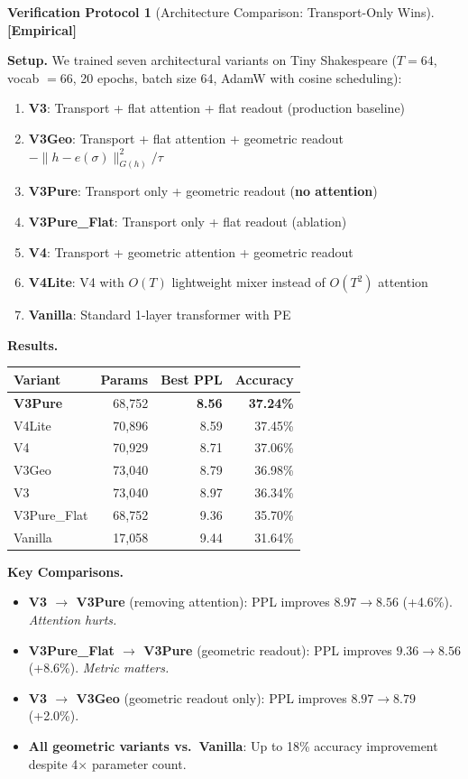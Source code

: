 \documentclass[11pt,a4paper]{article}
\theoremstyle{definition}
\newtheorem{protocol}[theorem]{Verification Protocol}
\theoremstyle{remark}
\newcommand{\statusempirical}{\textcolor{purple!70!black}{\textbf{[Empirical]}}}
\begin{document}
\begin{protocol}[Architecture Comparison: Transport-Only 
Wins]\label{prot:architecture_comparison}
\statusempirical

\textbf{Setup.} We trained seven architectural variants on 
Tiny Shakespeare ($T = 64$, vocab $= 66$, 20 epochs, batch 
size 64, AdamW with cosine scheduling):

\begin{enumerate}[label=\textbf{(\alph*)}]
    \item \textbf{V3}: Transport + flat attention + flat readout 
    (production baseline)
    \item \textbf{V3Geo}: Transport + flat attention + geometric 
    readout $-\|h - e(\sigma)\|^2_{G(h)}/\tau$
    \item \textbf{V3Pure}: Transport only + geometric readout 
    (\textbf{no attention})
    \item \textbf{V3Pure\_Flat}: Transport only + flat readout 
    (ablation)
    \item \textbf{V4}: Transport + geometric attention + geometric 
    readout
    \item \textbf{V4Lite}: V4 with $O(T)$ lightweight mixer instead 
    of $O(T^2)$ attention
    \item \textbf{Vanilla}: Standard 1-layer transformer with PE
\end{enumerate}

\textbf{Results.}
\begin{center}
\begin{tabular}{lrrr}
\toprule
Variant & Params & Best PPL & Accuracy \\
\midrule
\textbf{V3Pure} & 68{,}752 & \textbf{8.56} & \textbf{37.24\%} \\
V4Lite & 70{,}896 & 8.59 & 37.45\% \\
V4 & 70{,}929 & 8.71 & 37.06\% \\
V3Geo & 73{,}040 & 8.79 & 36.98\% \\
V3 & 73{,}040 & 8.97 & 36.34\% \\
V3Pure\_Flat & 68{,}752 & 9.36 & 35.70\% \\
Vanilla & 17{,}058 & 9.44 & 31.64\% \\
\bottomrule
\end{tabular}
\end{center}

\textbf{Key Comparisons.}
\begin{itemize}
    \item \textbf{V3 $\to$ V3Pure} (removing attention): 
    PPL improves $8.97 \to 8.56$ (+4.6\%). \emph{Attention hurts.}
    \item \textbf{V3Pure\_Flat $\to$ V3Pure} (geometric readout): 
    PPL improves $9.36 \to 8.56$ (+8.6\%). \emph{Metric matters.}
    \item \textbf{V3 $\to$ V3Geo} (geometric readout only): 
    PPL improves $8.97 \to 8.79$ (+2.0\%). 
    \item \textbf{All geometric variants vs.\ Vanilla}: 
    Up to 18\% accuracy improvement despite 4$\times$ parameter count.
\end{itemize}


\end{protocol}
\end{document}
